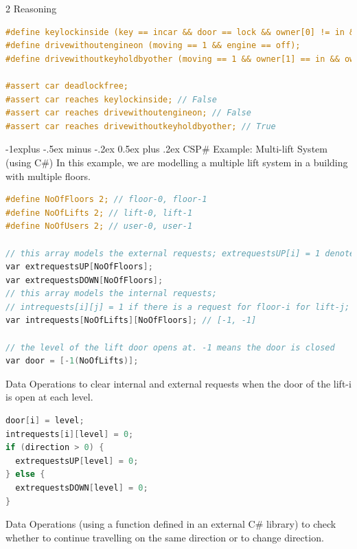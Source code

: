 \documentclass[10pt, landscape]{article}
\makeatletter
\renewcommand{\subsection}{\@startsection{subsection}{2}{0mm}%
  {-1explus -.5ex minus -.2ex}%
  {0.5ex plus .2ex}%
{\normalfont\normalsize\bfseries}}
\makeatother
\begin{document}
\begin{multicols*}{2}
  Reasoning
\begin{lstlisting}[language=C, basicstyle=\scriptsize\selectfont\ttfamily, mathescape]
#define keylockinside (key == incar && door == lock && owner[0] != in && owner[1] != in);
#define drivewithoutengineon (moving == 1 && engine == off);
#define drivewithoutkeyholdbyother (moving == 1 && owner[1] == in && owner[0] == far && key == 0);

#assert car deadlockfree;
#assert car reaches keylockinside; // False
#assert car reaches drivewithoutengineon; // False
#assert car reaches drivewithoutkeyholdbyother; // True
\end{lstlisting}

  \subsection{CSP\# Example: Multi-lift System (using C\#)}
  In this example, we are modelling a multiple lift system in a building with multiple floors.

\begin{lstlisting}[language=C, basicstyle=\scriptsize\selectfont\ttfamily, mathescape]
#define NoOfFloors 2; // floor-0, floor-1
#define NoOfLifts 2; // lift-0, lift-1
#define NoOfUsers 2; // user-0, user-1

// this array models the external requests; extrequestsUP[i] = 1 denotes there is an upward floor request at floor-i; 0 for no request;
var extrequestsUP[NoOfFloors];
var extrequestsDOWN[NoOfFloors];
// this array models the internal requests;
// intrequests[i][j] = 1 if there is a request for floor-i for lift-j; 0 for no request;
var intrequests[NoOfLifts][NoOfFloors]; // [-1, -1]

// the level of the lift door opens at. -1 means the door is closed
var door = [-1(NoOfLifts)];
\end{lstlisting}

  Data Operations to clear internal and external requests when the door of the lift-i is open at each level.

\begin{lstlisting}[language=C, basicstyle=\scriptsize\selectfont\ttfamily, mathescape]
door[i] = level;
intrequests[i][level] = 0;
if (direction > 0) {
  extrequestsUP[level] = 0;
} else {
  extrequestsDOWN[level] = 0;
}
\end{lstlisting}

  Data Operations (using a function defined in an external C\# library) to check whether to continue travelling on the same direction or to change direction.


\end{multicols*}
\end{document}
